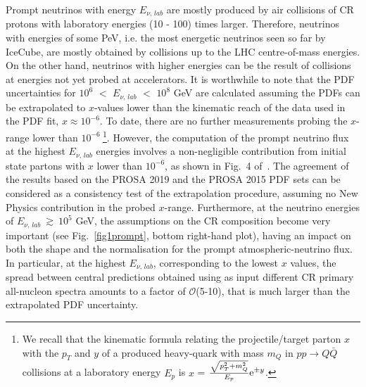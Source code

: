 Prompt neutrinos with energy $E_{\nu,\,lab}$ are mostly produced by air collisions of CR protons with laboratory energies (10 - 100) times larger. Therefore, neutrinos with energies of some PeV, i.e. the most energetic neutrinos seen so far by IceCube, are mostly obtained by collisions up to the LHC centre-of-mass energies. On the other hand, neutrinos with higher energies can be the result of collisions at energies not yet probed at accelerators. It is worthwhile to note that the PDF uncertainties for $10^6$ $<$ $E_{\nu,\,lab}$ $<$ $10^8$ GeV are calculated assuming the PDFs can be extrapolated to $x$-values lower than the kinematic reach of the data used in the PDF fit, $x \approx 10^{-6}$. To date, there are no further measurements probing the $x$-range lower than $10^{-6\,\,}$\footnote{We recall that the kinematic formula relating the projectile/target parton $x$ with the $p_T$ and $y$ of a produced heavy-quark with mass $m_Q$ in $pp \rightarrow Q\bar{Q}$ collisions at a laboratory energy $E_p$ is $x$ = $\frac{\sqrt{p_T^2 + m_Q^2}}{E_p}{\rm e}^{\pm y}$.}. However, the computation of the prompt neutrino flux at the highest $E_{\nu,\, lab}$ energies involves a non-negligible contribution from initial state partons with $x$ lower than $10^{-6}$, as shown in Fig.~4 of~\cite{Goncalves:2017lvq}.      
The agreement of the results based on the PROSA 2019 and the PROSA 2015 PDF sets can be considered as a consistency test of the extrapolation procedure, assuming no New Physics contribution in the probed $x$-range. Furthermore, at the neutrino energies of $E_{\nu,\,lab}~\gtrsim~10^5$ GeV, the assumptions on the CR composition become very important (see Fig.~\ref{fig1prompt}, bottom right-hand plot), having an impact on both the shape and the normalisation for the prompt atmospheric-neutrino flux. In particular, at the highest $E_{\nu,\, lab}$, corresponding to the lowest $x$ values, the spread between central predictions obtained using as input different CR primary all-nucleon spectra amounts to a factor of $\mathcal{O}$(5-10), that is much larger than the extrapolated PDF uncertainty.  

